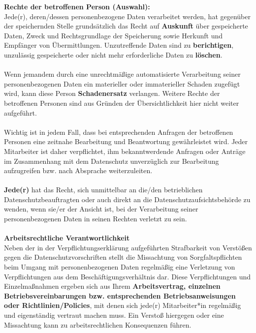 \documentclass[../Vorlagen/de-RSE_Kopf,a4paper]{scrlttr2}
\begin{document}
\textbf{Rechte der betroffenen Person (Auswahl):} \\
Jede(r), deren/dessen personenbezogene Daten verarbeitet werden, hat gegenüber der speichernden Stelle grundsätzlich das Recht auf \textbf{Auskunft} über gespeicherte Daten, Zweck und Rechtsgrundlage der Speicherung sowie Herkunft und Empfänger von Übermittlungen. Unzutreffende Daten sind zu \textbf{berichtigen}, unzulässig gespeicherte oder nicht mehr erforderliche Daten zu \textbf{löschen}. \\
\\
Wenn jemandem durch eine unrechtmäßige automatisierte Verarbeitung seiner
personenbezogenen Daten ein materieller oder immaterieller Schaden zugefügt wird, kann diese Person \textbf{Schadenersatz} verlangen. Weitere Rechte der betroffenen Personen sind aus Gründen der Übersichtlichkeit hier nicht weiter aufgeführt. \\
\\
Wichtig ist in jedem Fall, dass bei entsprechenden Anfragen der betroffenen Personen eine zeitnahe Bearbeitung und Beantwortung gewährleistet wird. Jeder Mitarbeiter ist daher verpflichtet, ihm bekanntwerdende Anfragen oder Anträge im Zusammenhang mit dem Datenschutz unverzüglich zur Bearbeitung aufzugreifen bzw. nach Absprache weiterzuleiten. \\
\\
\textbf{Jede(r)} hat das Recht, sich unmittelbar an die/den betrieblichen Datenschutzbeauftragten oder auch direkt an die Datenschutzaufsichtsbehörde zu wenden, wenn sie/er der Ansicht ist, bei der Verarbeitung seiner personenbezogenen Daten in seinen Rechten verletzt zu sein. \\
\\
\textbf{Arbeitsrechtliche Verantwortlichkeit} \\ 
Neben der in der Verpflichtungserklärung aufgeführten Strafbarkeit von Verstößen gegen die Datenschutzvorschriften stellt die Missachtung von Sorgfaltspflichten beim Umgang mit personenbezogenen Daten regelmäßig eine Verletzung von Verpflichtungen aus dem Beschäftigungsverhältnis dar. Diese Verpflichtungen und Einzelmaßnahmen ergeben sich aus Ihrem \textbf{Arbeitsvertrag, einzelnen Betriebsvereinbarungen bzw. entsprechenden Betriebsanweisungen oder Richtlinien/Policies}, mit denen sich jede(r) Mitarbeiter*in regelmäßig und eigenständig vertraut machen muss. Ein Verstoß hiergegen oder eine Missachtung kann zu arbeitsrechtlichen Konsequenzen führen. \\
\\
\end{document}
